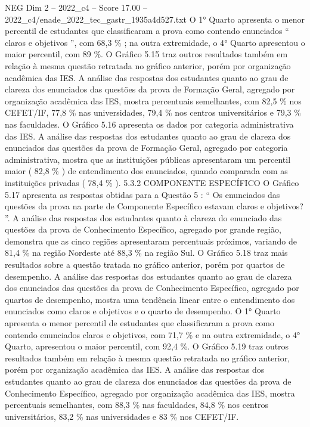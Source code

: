 \begin{textsample}{NEG Dim 2 – 2022\_c4 – Score 17.00 – 2022\_c4/enade\_2022\_tec\_gastr\_1935a4d527.txt}
O 1{\EmojiFont °} Quarto apresenta o menor percentil de estudantes que classificaram a prova como contendo enunciados “ claros e objetivos ”, com 68,3 \% ; na outra extremidade, o 4{\EmojiFont °} Quarto apresentou o maior percentil, com 89 \%.
O Gráfico 5.15 traz outros resultados também em relação à mesma questão retratada no gráfico anterior, porém por organização acadêmica das IES.
A análise das respostas dos estudantes quanto ao grau de clareza dos enunciados das questões da prova de Formação Geral, agregado por organização acadêmica das IES, mostra percentuais semelhantes, com 82,5 \% nos CEFET/IF, 77,8 \% nas universidades, 79,4 \% nos centros universitários e 79,3 \% nas faculdades.
O Gráfico 5.16 apresenta os dados por categoria administrativa das IES.
A análise das respostas dos estudantes quanto ao grau de clareza dos enunciados das questões da prova de Formação Geral, agregado por categoria administrativa, mostra que as instituições públicas apresentaram um percentil maior ( 82,8 \% ) de entendimento dos enunciados, quando comparada com as instituições privadas ( 78,4 \% ). 5.3.2 COMPONENTE ESPECÍFICO O Gráfico 5.17 apresenta as respostas obtidas para a Questão 5 : “ Os enunciados das questões da prova na parte de Componente Específico estavam claros e objetivos? ”.
A análise das respostas dos estudantes quanto à clareza do enunciado das questões da prova de Conhecimento Específico, agregado por grande região, demonstra que as cinco regiões apresentaram percentuais próximos, variando de 81,4 \% na região Nordeste até 88,3 \% na região Sul.
O Gráfico 5.18 traz mais resultados sobre a questão tratada no gráfico anterior, porém por quartos de desempenho.
A análise das respostas dos estudantes quanto ao grau de clareza dos enunciados das questões da prova de Conhecimento Específico, agregado por quartos de desempenho, mostra uma tendência linear entre o entendimento dos enunciados como claros e objetivos e o quarto de desempenho.
O 1{\EmojiFont °} Quarto apresenta o menor percentil de estudantes que classificaram a prova como contendo enunciados claros e objetivos, com 71,7 \% e na outra extremidade, o 4{\EmojiFont °} Quarto, apresentou o maior percentil, com 92,4 \%.
O Gráfico 5.19 traz outros resultados também em relação à mesma questão retratada no gráfico anterior, porém por organização acadêmica das IES.
A análise das respostas dos estudantes quanto ao grau de clareza dos enunciados das questões da prova de Conhecimento Específico, agregado por organização acadêmica das IES, mostra percentuais semelhantes, com 88,3 \% nas faculdades, 84,8 \% nos centros universitários, 83,2 \% nas universidades e 83 \% nos CEFET/IF.

\end{textsample}
